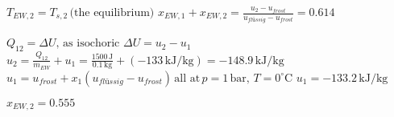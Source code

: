 \( T_{EW,2} = T_{s,2} \, \text{(the equilibrium)} \)  
\( x_{EW,1} + x_{EW,2} = \frac{u_2 - u_{frost}}{u_{flüssig} - u_{frost}} = 0.614 \)  

\( Q_{12} = \Delta U, \, \text{as isochoric} \)  
\( \Delta U = u_2 - u_1 \)  
\( u_2 = \frac{Q_{12}}{m_{EW}} + u_1 = \frac{1500 \, \text{J}}{0.1 \, \text{kg}} + (-133 \, \text{kJ/kg}) = -148.9 \, \text{kJ/kg} \)  
\( u_1 = u_{frost} + x_1 (u_{flüssig} - u_{frost}) \, \text{all at} \, p = 1 \, \text{bar}, \, T = 0^\circ \text{C} \)  
\( u_1 = -133.2 \, \text{kJ/kg} \)  

\( x_{EW,2} = 0.555 \)